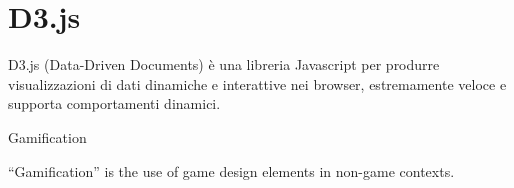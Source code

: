 \documentclass[
]{article}
\begin{document}
{}

\section{\texorpdfstring{{D3.js}}{D3.js}}\label{h.v8q9ek1s8rk1}

{D3.js (Data-Driven Documents) è una libreria Javascript per produrre
visualizzazioni di dati dinamiche e interattive nei browser,
estremamente veloce e supporta comportamenti dinamici.}

{}

{}

{Gamification}

{``Gamification'' is the use of game design elements in non-game
contexts.}

{}

{}
\end{document}
